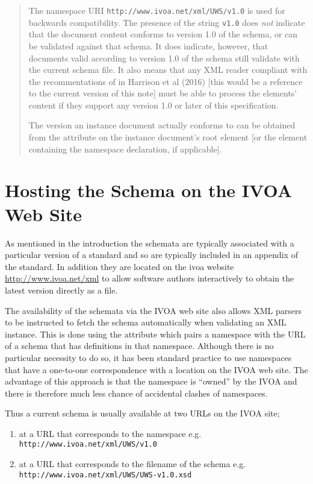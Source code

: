 \documentclass[10pt,a4paper]{ivoa}
\begin{document}
\begin{quotation}
The namespace URI \nolinkurl{http://www.ivoa.net/xml/UWS/v1.0} is used
for backwards compatibility.  The presence of the string \texttt{v1.0}
does \emph{not} indicate that the document content conforms to version
1.0 of the schema, or can be validated against that schema.  It does
indicate, however, that documents valid according to version 1.0 of the
schema still validate with the current schema file.  It also means that
any XML reader compliant with the recommentations of in Harrison et al
(2016) [this would be a reference to the current version of this note]
must be able to process the elements' content if they support any
version 1.0 or later of this specification.

The version an instance document actually conforms to can be obtained
from the  attribute on the instance document's root
element [or the element containing the namespace declaration, if
applicable].  
\end{quotation}



\section{Hosting the Schema on the IVOA Web Site}
As mentioned in the introduction the schemata are typically associated with a
particular version of a standard and so are typically included in an appendix of
the standard. In addition they are located on the ivoa website
\url{http://www.ivoa.net/xml} to allow software authors interactively to
obtain the latest version directly as a file.

The availability of the schemata via the IVOA web site also
allows XML parsers to be instructed to fetch the schema automatically when
validating an XML instance. This is done using the 
attribute which pairs a namespace with the URL of a schema that has definitions
in that namespace. Although there is no particular necessity to do so, it has
been standard practice to use namespaces that have a one-to-one correspondence
with a location on the IVOA web site. The advantage of this approach is that the
namespace is ``owned'' by the IVOA and there is therefore much less chance of
accidental clashes of namespaces.

Thus a current schema is usually available at two URLs on the IVOA site;
\begin{enumerate}
  \item at a URL that corresponds to the namespace \newline e.g.
  \texttt{http://www.ivoa.net/xml/UWS/v1.0}
  \item at a URL that corresponds to the filename of the schema \newline e.g.
  \texttt{http://www.ivoa.net/xml/UWS/UWS-v1.0.xsd}
\end{enumerate}
\end{document}
